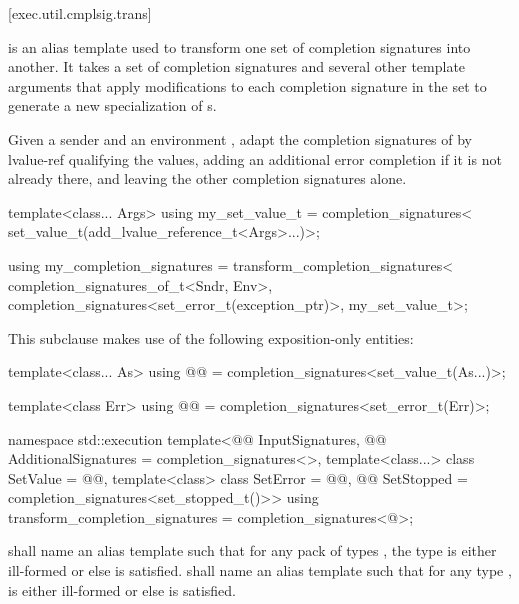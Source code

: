 [exec.util.cmplsig.trans]{}

\pnum
{} is an alias template
used to transform one set of completion signatures into another.
It takes a set of completion signatures and
several other template arguments
that apply modifications to each completion signature in the set
to generate a new specialization of s.
\pnum
\begin{example}
Given a sender  and an environment ,
adapt the completion signatures of  by
lvalue-ref qualifying the values,
adding an additional  error completion
if it is not already there, and
leaving the other completion signatures alone.
\begin{codeblock}
template<class... Args>
  using my_set_value_t =
    completion_signatures<
      set_value_t(add_lvalue_reference_t<Args>...)>;

using my_completion_signatures =
  transform_completion_signatures<
    completion_signatures_of_t<Sndr, Env>,
    completion_signatures<set_error_t(exception_ptr)>,
    my_set_value_t>;
\end{codeblock}
\end{example}

\pnum
This subclause makes use of the following exposition-only entities:
\begin{codeblock}
template<class... As>
  using @@ =
    completion_signatures<set_value_t(As...)>;

template<class Err>
  using @@ =
    completion_signatures<set_error_t(Err)>;
\end{codeblock}

\pnum
\begin{codeblock}
namespace std::execution {
  template<@@ InputSignatures,
           @@ AdditionalSignatures = completion_signatures<>,
           template<class...> class SetValue = @@,
           template<class> class SetError = @@,
           @@ SetStopped = completion_signatures<set_stopped_t()>>
  using transform_completion_signatures = completion_signatures<@\seebelow@>;
}
\end{codeblock}

\pnum
{} shall name an alias template
such that for any pack of types ,
the type  is either ill-formed or else
 is satisfied.
 shall name an alias template
such that for any type ,
 is either ill-formed or else
 is satisfied.

